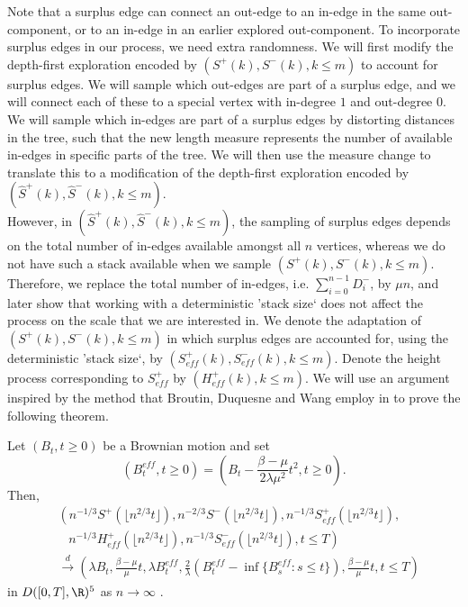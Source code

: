 Note that a surplus edge can connect an out-edge to an in-edge in the same out-component, or to an in-edge in an earlier explored out-component. To incorporate surplus edges in our process, we need extra randomness. We will first modify the depth-first exploration encoded by $(S^+(k),S^-(k), k\leq m)$ to account for surplus edges. We will sample which out-edges are part of a surplus edge, and we will connect each of these to a special vertex with in-degree $1$ and out-degree $0$. We will sample which in-edges are part of a surplus edges by distorting distances in the tree, such that the new length measure represents the number of available in-edges in specific parts of the tree. We will then use the measure change to translate this to a modification of the depth-first exploration encoded by $(\hat{S}^+(k),\hat{S}^-(k), k\leq m)$. \\
However, in $(\hat{S}^+(k),\hat{S}^-(k), k\leq m)$, the sampling of surplus edges depends on the total number of in-edges available amongst all $n$ vertices, whereas we do not have such a stack available when we sample $(S^+(k),S^-(k), k\leq m)$. Therefore, we replace the total number of in-edges, i.e. $\sum_{i=0}^{n-1} D^-_i$, by $\mu n$, and later show that working with a deterministic 'stack size` does not affect the process on the scale that we are interested in. We denote the adaptation of $(S^+(k),S^-(k), k\leq m)$ in which surplus edges are accounted for, using the deterministic 'stack size`, by $(S^+_{eff}(k),S^-_{eff}(k), k\leq m)$. Denote the height process corresponding to $S^+_{eff}$ by $(H^+_{eff}(k), k\leq m)$. We will use an argument inspired by the method that Broutin, Duquesne and Wang employ in \cite{broutinLimitsMultiplicativeInhomogeneous2020} to prove the following theorem. 
\begin{theorem}\label{thm.convergenceSeff}
Let $(B_t,t\geq 0)$ be a Brownian motion and set $$(B^{eff}_t,t\geq 0)=\left(B_t-\frac{\beta - \mu}{2\lambda \mu^2}t^2,t\geq 0\right).$$ Then,
\begin{align*}
    &\left(n^{-1/3}S^+\left(\lfloor n^{2/3}t\rfloor\right),n^{-2/3}S^-\left(\lfloor n^{2/3}t\rfloor\right), n^{-1/3}S^+_{eff}\left(\lfloor n^{2/3}t\rfloor\right),\right.\\
    &\;\;\;\left.n^{-1/3}H^+_{eff}\left(\lfloor n^{2/3}t\rfloor\right), n^{-1/3}S^-_{eff}\left(\lfloor n^{2/3}t\rfloor\right), t\leq T\right)\\
    &\overset{d}{\to}\left(\lambda B_t, \frac{\beta-\mu}{\mu} t, \lambda B^{eff}_t,  \frac{2}{\lambda} \left(B^{eff}_{t}-\inf\{B^{eff}_{s}:s\leq t\}\right), \frac{\beta-\mu}{\mu} t, t\leq T\right)
\end{align*}
in $D([0,T],\R)^5$ as $n\to \infty$ . 
\end{theorem}

